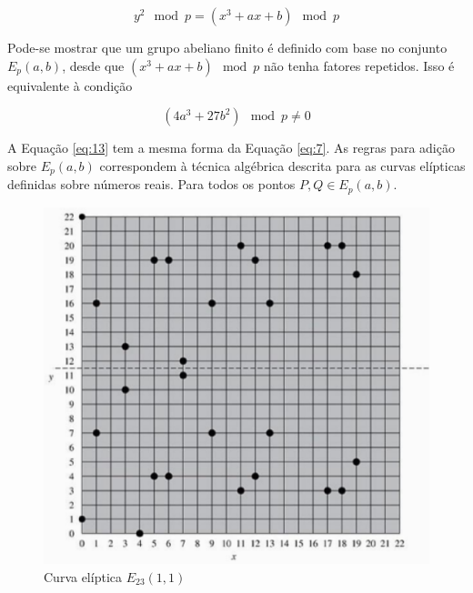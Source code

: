 \begin{equation}
y^2 \mod p = (x^3 + ax + b) \mod p
\end{equation}

Pode-se mostrar que um grupo abeliano finito é definido com base no conjunto $E_p(a, b)$, desde que $(x^3 + ax + b) \mod p$ não tenha fatores repetidos. Isso é equivalente à condição

\begin{equation}
(4a^3 + 27b^2) \mod p \neq 0 \label{eq:13}
\end{equation}

A Equação \ref{eq:13} tem a mesma forma da Equação \ref{eq:7}. As regras para adição sobre $E_p(a, b)$ correspondem à técnica algébrica descrita para as curvas elípticas definidas sobre números reais. Para todos os pontos $P, Q \in E_p(a, b)$.

\begin{figure}[h]
\centering
\includegraphics[scale=0.6, bb=0 0 515 478]{figuras/curva_sobre_corpo_finito.eps}
\caption{Curva elíptica $E_{23}(1, 1)$}
\label{fig:curvas}
\end{figure}

